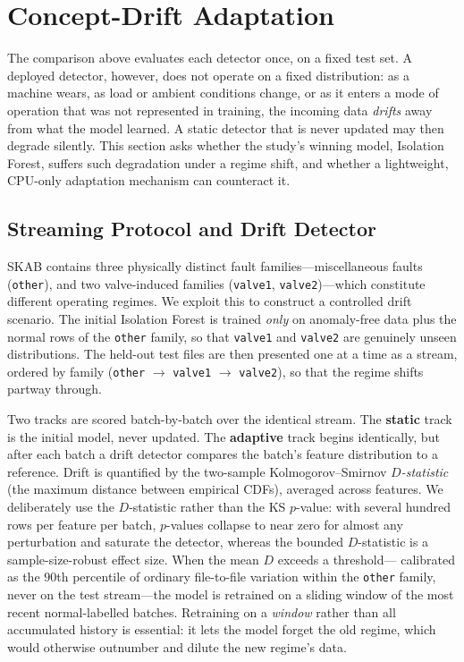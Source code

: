 \documentclass[conference]{IEEEtran}
\begin{document}
\section{Concept-Drift Adaptation}
\label{sec:drift}
The comparison above evaluates each detector once, on a fixed test set. A
deployed detector, however, does not operate on a fixed distribution: as a
machine wears, as load or ambient conditions change, or as it enters a mode of
operation that was not represented in training, the incoming data
\emph{drifts} away from what the model learned. A static detector that is never
updated may then degrade silently. This section asks whether the study's
winning model, Isolation Forest, suffers such degradation under a regime shift,
and whether a lightweight, CPU-only adaptation mechanism can counteract it.

\subsection{Streaming Protocol and Drift Detector}
SKAB contains three physically distinct fault families---miscellaneous faults
(\texttt{other}), and two valve-induced families (\texttt{valve1},
\texttt{valve2})---which constitute different operating regimes. We exploit this
to construct a controlled drift scenario. The initial Isolation Forest is
trained \emph{only} on anomaly-free data plus the normal rows of the
\texttt{other} family, so that \texttt{valve1} and \texttt{valve2} are genuinely
unseen distributions. The held-out test files are then presented one at a time
as a stream, ordered by family (\texttt{other} $\rightarrow$ \texttt{valve1}
$\rightarrow$ \texttt{valve2}), so that the regime shifts partway through.

Two tracks are scored batch-by-batch over the identical stream. The
\textbf{static} track is the initial model, never updated. The
\textbf{adaptive} track begins identically, but after each batch a drift
detector compares the batch's feature distribution to a reference. Drift is
quantified by the two-sample Kolmogorov--Smirnov \emph{$D$-statistic} (the
maximum distance between empirical CDFs), averaged across features. We
deliberately use the $D$-statistic rather than the KS $p$-value: with several
hundred rows per feature per batch, $p$-values collapse to near zero for almost
any perturbation and saturate the detector, whereas the bounded $D$-statistic is
a sample-size-robust effect size. When the mean $D$ exceeds a threshold---
calibrated as the $90$th percentile of ordinary file-to-file variation within
the \texttt{other} family, never on the test stream---the model is retrained on
a sliding window of the most recent normal-labelled batches. Retraining on a
\emph{window} rather than all accumulated history is essential: it lets the
model forget the old regime, which would otherwise outnumber and dilute the new
regime's data.
\end{document}

